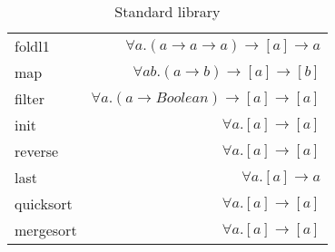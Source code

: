 \begin{table}[H]
\begin{tabular}{l r}
    foldl1 & $\forall a. (a \rightarrow a \rightarrow a) \rightarrow [a] \rightarrow a$\\
    map & $\forall a b. (a \rightarrow b) \rightarrow [a] \rightarrow [b]$ \\
    filter & $\forall a. (a \rightarrow Boolean) \rightarrow [a] \rightarrow [a] $\\
    init & $\forall a. [a] \rightarrow [a]$ \\
    reverse & $\forall a. [a] \rightarrow [a]$ \\
    last & $\forall a. [a] \rightarrow a$ \\
    quicksort & $\forall a. [a] \rightarrow [a]$ \\
    mergesort & $\forall a. [a] \rightarrow [a]$ \\
    \end{tabular}
    \caption{Standard library}
\label{table:standard}
\end{table}

